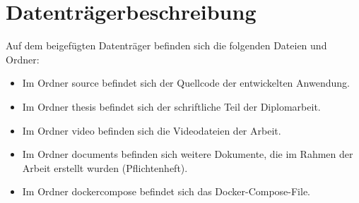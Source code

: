 \section{Datenträgerbeschreibung}

Auf dem beigefügten Datenträger befinden sich die folgenden Dateien und Ordner:

\begin{itemize}
    \item Im Ordner source befindet sich der Quellcode der entwickelten Anwendung.
    \item Im Ordner thesis befindet sich der schriftliche Teil der Diplomarbeit.
    \item Im Ordner video befinden sich die Videodateien der Arbeit.
    \item Im Ordner documents befinden sich weitere Dokumente, die im Rahmen der Arbeit erstellt wurden (Pflichtenheft).
    \item Im Ordner dockercompose befindet sich das Docker-Compose-File.
\end{itemize}